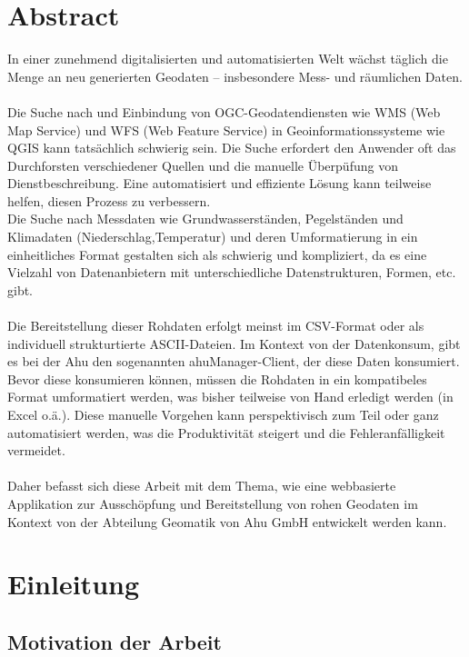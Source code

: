 \documentclass[a4paper,12pt]{scrreprt}
\begin{document}
\cleardoublepage
\chapter*{Abstract}
\thispagestyle{plain}
In einer zunehmend digitalisierten und automatisierten Welt wächst täglich die Menge an neu generierten Geodaten – insbesondere Mess- und räumlichen Daten.\\ \\
Die Suche nach und Einbindung von OGC-Geodatendiensten wie WMS (Web Map Service) und WFS (Web Feature Service) in Geoinformationssysteme wie QGIS kann tatsächlich schwierig sein. Die Suche erfordert den Anwender oft das Durchforsten verschiedener Quellen und die manuelle Überpüfung von Dienstbeschreibung. Eine automatisiert und effiziente Lösung kann teilweise helfen, diesen Prozess zu verbessern. \\ 
Die Suche nach Messdaten wie Grundwasserständen, Pegelständen und Klimadaten (Niederschlag,Temperatur) und deren Umformatierung in ein einheitliches Format gestalten sich als schwierig und kompliziert, da es eine Vielzahl von Datenanbietern mit unterschiedliche Datenstrukturen, Formen, etc. gibt.\\ \\
Die Bereitstellung dieser Rohdaten erfolgt meinst im CSV-Format oder als individuell strukturtierte ASCII-Dateien. Im Kontext von der Datenkonsum, gibt es bei der Ahu den sogenannten ahuManager-Client, der diese Daten konsumiert. Bevor diese konsumieren können, müssen die Rohdaten in ein kompatibeles Format umformatiert werden, was bisher teilweise von Hand erledigt werden (in Excel o.ä.). Diese manuelle Vorgehen kann perspektivisch zum Teil oder ganz automatisiert werden, was die Produktivität steigert und die Fehleranfälligkeit vermeidet. \\ \\
Daher befasst sich diese Arbeit  mit dem Thema, wie eine webbasierte Applikation zur Ausschöpfung und Bereitstellung von rohen Geodaten im Kontext von der Abteilung Geomatik von Ahu GmbH entwickelt werden kann.

\clearpage
\chapter{Einleitung}

\section{Motivation der Arbeit}
\end{document}

